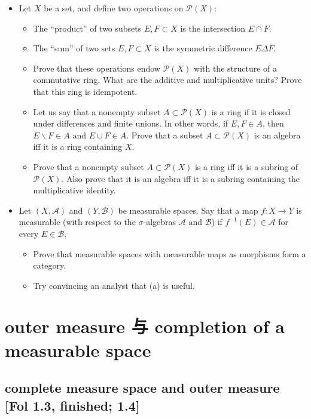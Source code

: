 \documentclass{qlnotes-export}
\begin{document}
\begin{itemize}
\item
  Let \(X\) be a set, and define two operations on \(\mathcal{P}(X)\):

  \begin{itemize}
  \item
    The ``product'' of two subsets \(E,F \subset X\) is the intersection \(E \cap F\).
  \item
    The ``sum'' of two sets \(E,F \subset X\) is the symmetric difference \(E\Delta F\).
  \item
    Prove that these operations endow \(\mathcal{P}(X)\) with the structure of a commutative ring. What are the additive and multiplicative units? Prove that this ring is idempotent.
  \item
    Let us say that a nonempty subset \(A \subset \mathcal{P}(X)\) is a ring if it is closed under differences and finite unions. In other words, if \(E,F \in A\), then \(E\backslash F \in A\) and \(E \cup F \in A\). Prove that a subset \(A \subset \mathcal{P}(X)\) is an algebra iff it is a ring containing \(X\).
  \item
    Prove that a nonempty subset \(A \subset \mathcal{P}(X)\) is a ring iff it is a subring of \(\mathcal{P}(X)\). Also prove that it is an algebra iff it is a subring containing the multiplicative identity.
  \end{itemize}
\item
  Let \((X,\mathcal{A})\) and \((Y,\mathcal{B})\) be measurable spaces. Say that a map \(f:X\rightarrow Y\) is measurable (with respect to the \(\sigma\)-algebras \(\mathcal{A}\) and \(\mathcal{B}\)) if \(f^{- 1}(E) \in \mathcal{A}\) for every \(E \in \mathcal{B}\).

  \begin{itemize}
  \item
    Prove that measurable spaces with measurable maps as morphisms form a category.
  \item
    Try convincing an analyst that (a) is useful.
  \end{itemize}
\end{itemize}

\chapter{outer measure 与 completion of a measurable space}\label{outer-measure-ux4e0e-completion-of-a-measurable-space}

\section{complete measure space and outer measure {[}Fol 1.3, finished; 1.4{]}}
\end{document}
